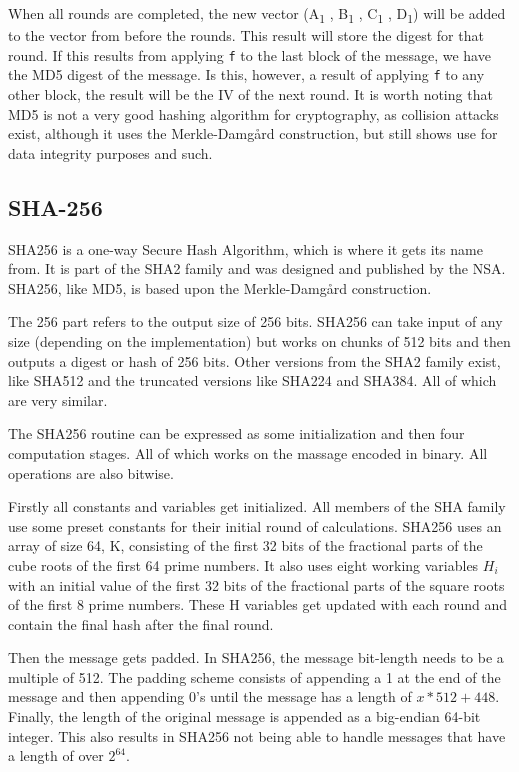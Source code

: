 \documentclass[a4paper]{article}
\begin{document}
When all rounds are completed, the new vector (A\textsubscript{1} , B\textsubscript{1} , C\textsubscript{1} , D\textsubscript{1}) will be added to the vector from before the rounds. This result will store the digest for that round. If this results from applying \texttt{f} to the last block of the message, we have the MD5 digest of the message. Is this, however, a result of applying \texttt{f} to any other block, the result will be the IV of the next round.
It is worth noting that MD5 is not a very good hashing algorithm for cryptography, as collision attacks exist, although it uses the Merkle-Damgård construction, but still shows use for data integrity purposes and such.
\subsection{SHA-256}
\label{SHAalg}
SHA256 is a one-way Secure Hash Algorithm, which is where it gets its name from.
It is part of the SHA2 family and was designed and published by the NSA.
SHA256, like MD5, is based upon the Merkle-Damgård construction.

The 256 part refers to the output size of 256 bits.
SHA256 can take input of any size (depending on the implementation) but works
on chunks of 512 bits and then outputs a digest or hash of 256 bits.
Other versions from the SHA2 family exist, like SHA512 and the truncated
versions like SHA224 and SHA384. All of which are very similar.

The SHA256 routine can be expressed as some initialization and then four computation stages.
All of which works on the massage encoded in binary. All operations are also bitwise.

Firstly all constants and variables get initialized. All members of the SHA family use some preset constants for their initial round of calculations.
SHA256 uses an array of size 64, K, consisting of the first 32 bits of the fractional parts of the cube roots of the first 64 prime numbers.
It also uses eight working variables \(H_i\) with an initial value of the first 32 bits of the fractional parts of the square roots of the first 8 prime numbers.
These H variables get updated with each round and contain the final hash after the final round.

Then the message gets padded. In SHA256, the message bit-length needs to be a multiple of 512.
The padding scheme consists of appending a 1 at the end of the message and then appending 0's until the message has a length of \(x*512+448\).
Finally, the length of the original message is appended as a big-endian 64-bit integer.
This also results in SHA256 not being able to handle messages that have a length of over \(2^{64}\).
\end{document}
